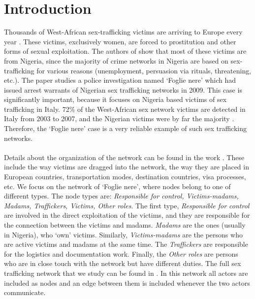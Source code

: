 \documentclass[10p]{article}
\theoremstyle{definition}
\theoremstyle{definition}
\begin{document}
\section{Introduction}
Thousands of West-African sex-trafficking victims are arriving to Europe every year \cite{morselli2009inside}. These victims, exclusively women, are forced to prostitution and other forms of sexual exploitation. The authors of \cite{olagbegi2006human} show that most of these victims are from Nigeria, since the majority of crime networks in Nigeria are based on sex-trafficking for various reasons (unemployment, persuasion via rituals, threatening, etc.). The paper \cite{mancuso2014not} studies a police investigation named `Foglie nere' which had issued arrest warrants of Nigerian sex trafficking networks in 2009. This case is significantly important, because it focuses on Nigeria based victims of sex trafficking in Italy. 72\% of the West-African sex network victims are detected in Italy from 2003 to 2007, and the Nigerian victims were by far the majority \cite{morselli2009inside}. Therefore, the `Foglie nere' case is a very reliable example of such sex trafficking networks. \\  \\
Details about the organization of the network can be found in the work \cite{mancuso2014not}. These include the way victims are dragged into the network, the way they are placed in European countries, transportation modes, destination countries, visa processes, etc. We focus on the network of `Foglie nere', where nodes belong to one of different types. The node types are: \textit{Responsible for control, Victims-madams, Madams, Traffickers, Victims, Other roles}. The first type, \textit{Responsible for control} are involved in the direct exploitation of the victims, and they are responsible for the connection between the victims and madams. \textit{Madams} are the ones (usually in Nigeria), who `own' victims. Similarly, \textit{Victims-madams} are the persons who are active victims and madams at the same time. The \textit{Traffickers} are responsible for the logistics and documentation work. Finally, the \textit{Other roles} are persons who are in close touch with the network but have different duties. The full sex trafficking network that we study can be found in \cite{mancuso2014not}. In this network all actors are included as nodes and an edge between them is included whenever the two actors communicate.
\end{document}
